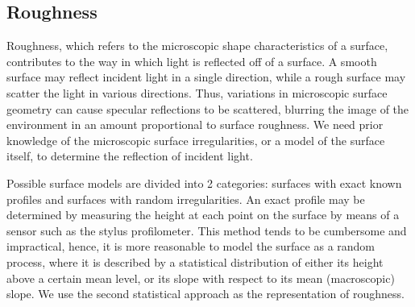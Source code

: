 \subsection{Roughness}
Roughness, which refers to the microscopic shape characteristics of a surface, contributes to the way in which light is reflected off of a surface. A smooth surface may reflect incident light in a single direction, while a rough surface may scatter the light in various directions. Thus, variations in microscopic surface geometry can cause specular reflections to be scattered, blurring the image of the environment in an amount proportional to surface roughness. We need prior knowledge of the microscopic surface irregularities, or a model of the surface itself, to determine the reflection of incident light.

Possible surface models are divided into 2 categories: surfaces with exact known profiles and surfaces with random irregularities. An exact profile may be determined by measuring the height at each point on the surface by means of a sensor such as the stylus profilometer. This method tends to be cumbersome and impractical, hence, it is more reasonable to model the surface as a random process, where it is described by a statistical distribution of either its height above a certain mean level, or its slope with respect to its mean (macroscopic) slope. We use the second statistical approach as the representation of roughness.





